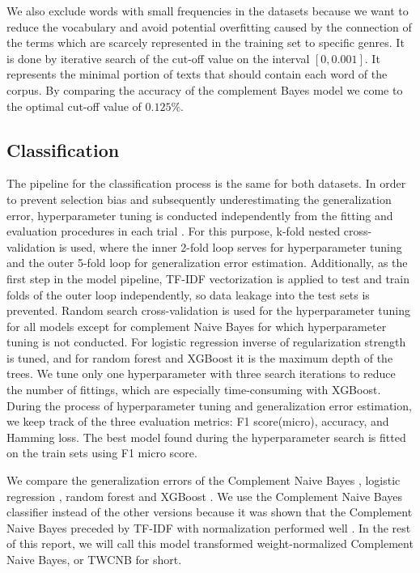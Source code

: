 \documentclass{article}
\begin{document}
\par We also exclude words with small frequencies in the datasets because we want to reduce the vocabulary and avoid potential overfitting caused by the connection of the terms which are scarcely represented in the training set to specific genres. It is done by iterative search of the cut-off value on the interval $[0, 0.001]$. It represents the minimal portion of texts that should contain each word of the corpus. By comparing the accuracy of the complement Bayes model we come to the optimal cut-off value of $0.125\%$.

\subsection{Classification}

\par The pipeline for the classification process is the same for both datasets. In order to prevent selection bias and subsequently underestimating the generalization error, hyperparameter tuning is conducted independently from the fitting and evaluation procedures in each trial \cite{cawley2010over}. For this purpose, k-fold nested cross-validation is used, where the inner 2-fold loop serves for hyperparameter tuning and the outer 5-fold loop for generalization error estimation. Additionally, as the first step in the model pipeline, TF-IDF vectorization is applied to test and train folds of the outer loop independently, so data leakage into the test sets is prevented. Random search cross-validation is used for the hyperparameter tuning for all models except for complement Naive Bayes for which hyperparameter tuning is not conducted. For logistic regression inverse of regularization strength is tuned, and for random forest and XGBoost it is the maximum depth of the trees. We tune only one hyperparameter with three search iterations to reduce the number of fittings, which are especially time-consuming with XGBoost. During the process of hyperparameter tuning and generalization error estimation, we keep track of the three evaluation metrics: F1 score(micro), accuracy, and Hamming loss. The best model found during the hyperparameter search is fitted on the train sets using F1 micro score.
\par We compare the generalization errors of the Complement Naive Bayes \cite{rennie2003tackling}, logistic regression \cite{bishop2006pattern}, random forest \cite{ho1995random} and XGBoost \cite{chen2016xgboost}. We use the Complement Naive Bayes classifier instead of the other versions because it was shown that the Complement Naive Bayes preceded by TF-IDF with normalization performed well \cite{rennie2003tackling}. In the rest of this report, we will call this model transformed weight-normalized Complement Naive Bayes, or TWCNB for short.
\end{document}
